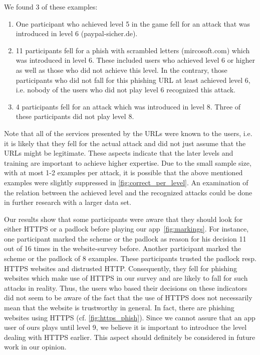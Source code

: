 \begin{description}[leftmargin=0cm]
We found 3 of these examples:
\begin{enumerate}
\item One participant who achieved level 5 in the game fell for an attack that was introduced in level 6 (paypal-sicher.de).
\item 11 participants fell for a phish with scrambled letters (mircosoft.com) which was introduced in level 6. These included users who achieved level 6 or higher as well as those who did not achieve this level. In the contrary, those participants who did not fall for this phishing URL at least achieved level 6, i.e. nobody of the users who did not play level 6 recognized this attack. 
\item 4 participants fell for an attack which was introduced in level 8. Three of these participants did not play level 8.
\end{enumerate}
	Note that all of the services presented by the URLs were known to the users, i.e. it is likely that they fell for the actual attack and did not just assume that the URLs might be legitimate.
	These aspects indicate that the later levels and training are important to achieve higher expertise.
	Due to the small sample size, with at most 1-2 examples per attack, it is possible that the above mentioned examples were slightly suppressed in \autoref{fig:correct_per_level}.
	An examination of the relation between the achieved level and the recognized attacks could be done in further research with a larger data set.
	\item[HTTPS and Padlock:] Our results show that some participants were aware that they should look for either HTTPS or a padlock before playing our app~\autoref{fig:markings}.
	For instance, one participant marked the scheme or the padlock as reason for his decision 11 out of 16 times in the website-survey before. 
	Another participant marked the scheme or the padlock of 8 examples.
	These participants trusted the padlock resp. HTTPS websites and distrusted HTTP.
	Consequently, they fell for phishing websites which make use of HTTPS in our survey and are likely to fall for such attacks in reality.
	Thus, the users who based their decisions on these indicators did not seem to be aware of the fact that the use of HTTPS does not necessarily mean that the website is trustworthy in general.
	In fact, there are phishing websites using HTTPS (cf. \autoref{fig:https_phish}). 
	Since we cannot assure that an app user of ours plays until level 9, we believe it is important to introduce the level dealing with HTTPS earlier.
	This aspect should definitely be considered in future work in our opinion.

\end{description}
